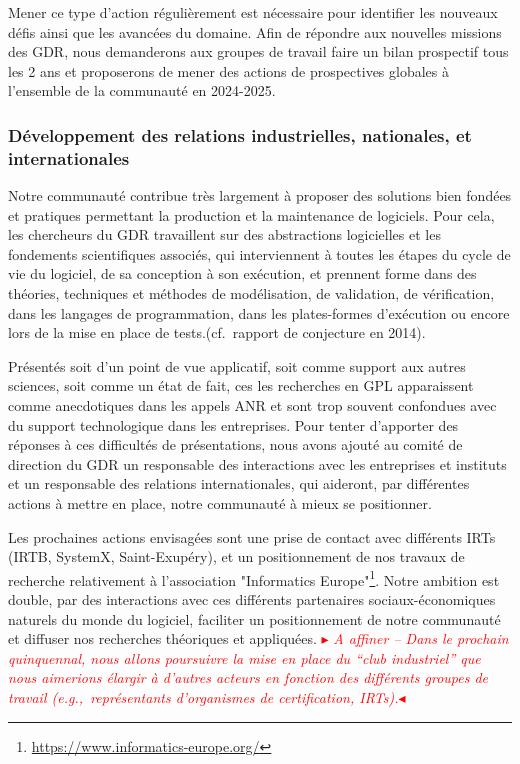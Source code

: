 \documentclass[11pt]{article}
\newcommand{\mynote}[3][black]{\textcolor{#1}{\fbox{\bfseries\sffamily\scriptsize{#2}}
{\small$\blacktriangleright$\textsf{\emph{#3}}$\blacktriangleleft$}}}
\newcommand{\TODO}[1]{\mynote[red]{TODO}{#1}}
\newcommand{\eg}[0]{\emph{e.g.},~}
\newcommand{\cf}[0]{cf.~}
\begin{document}
Mener ce type d'action régulièrement est
nécessaire pour identifier les nouveaux défis ainsi que les avancées du
domaine. 
Afin de répondre aux nouvelles missions des GDR, nous demanderons aux groupes de travail faire un bilan prospectif tous les 2 ans et proposerons de mener des actions de prospectives globales à l'ensemble de la communauté en 2024-2025.


\subsubsection{Développement des relations industrielles, nationales, et internationales}
Notre communauté contribue très largement à proposer des solutions bien fondées et pratiques permettant la production et la maintenance de logiciels. 
Pour cela, les chercheurs du GDR travaillent sur des abstractions logicielles et les fondements scientifiques
associés, qui interviennent à toutes les étapes du cycle de vie du logiciel, de sa conception à son exécution, et prennent forme dans des théories, techniques et
méthodes de modélisation, de validation, de vérification, dans les langages de programmation, dans les
plates-formes d’exécution ou encore lors de la mise en place de tests.(\cf rapport de conjecture en 2014).

Présentés soit d'un point de vue applicatif, soit comme support aux autres sciences, soit comme un état de fait, ces les recherches en GPL apparaissent comme anecdotiques dans les appels ANR et sont trop souvent confondues avec du support technologique dans les entreprises. Pour tenter d'apporter des réponses à ces difficultés de présentations, nous avons ajouté au comité de direction du GDR un responsable des interactions avec les entreprises et instituts et un responsable des relations internationales, qui aideront, par différentes actions à mettre en place, notre communauté à mieux se positionner.

Les prochaines actions envisagées sont une prise de contact avec différents IRTs (IRTB, SystemX, Saint-Exupéry), et un positionnement de nos travaux de recherche relativement à l'association "Informatics Europe"\footnote{\url{https://www.informatics-europe.org/}}.
Notre ambition est double, par des interactions avec ces différents partenaires sociaux-économiques naturels du monde du logiciel, faciliter un positionnement de notre communauté et diffuser nos recherches théoriques et appliquées.
\TODO{ A affiner -- 
Dans le prochain quinquennal, nous allons poursuivre la mise en place du “club industriel” que nous aimerions élargir à d'autres acteurs en fonction des différents groupes de travail (\eg représentants d'organismes de certification, IRTs).}
\end{document}
